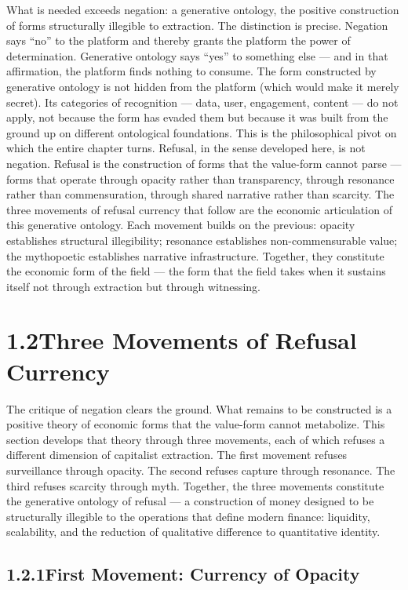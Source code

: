 What is needed exceeds negation: a generative ontology, the positive construction of forms structurally illegible to extraction. The distinction is precise. Negation says “no” to the platform and thereby grants the platform the power of determination. Generative ontology says “yes” to something else — and in that affirmation, the platform finds nothing to consume. The form constructed by generative ontology is not hidden from the platform (which would make it merely secret). Its categories of recognition — data, user, engagement, content — do not apply, not because the form has evaded them but because it was built from the ground up on different ontological foundations. This is the philosophical pivot on which the entire chapter turns. Refusal, in the sense developed here, is not negation. Refusal is the construction of forms that the value-form cannot parse — forms that operate through opacity rather than transparency, through resonance rather than commensuration, through shared narrative rather than scarcity. The three movements of refusal currency that follow are the economic articulation of this generative ontology. Each movement builds on the previous: opacity establishes structural illegibility; resonance establishes non-commensurable value; the mythopoetic establishes narrative infrastructure. Together, they constitute the economic form of the field — the form that the field takes when it sustains itself not through extraction but through witnessing.

\section{1.2\quad Three Movements of Refusal Currency}

The critique of negation clears the ground. What remains to be constructed is a positive theory of economic forms that the value-form cannot metabolize. This section develops that theory through three movements, each of which refuses a different dimension of capitalist extraction. The first movement refuses surveillance through opacity. The second refuses capture through resonance. The third refuses scarcity through myth. Together, the three movements constitute the generative ontology of refusal — a construction of money designed to be structurally illegible to the operations that define modern finance: liquidity, scalability, and the reduction of qualitative difference to quantitative identity.

\subsection{1.2.1\quad First Movement: Currency of Opacity}

